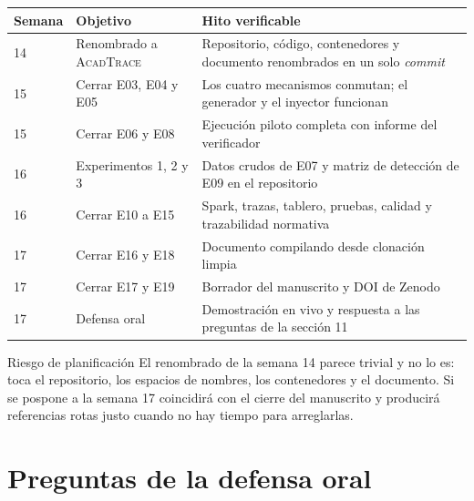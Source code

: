 \documentclass[11pt,a4paper]{article}
\begin{document}
\begin{center}
	\small
	\begin{tabular}{@{}p{1.8cm}p{6.4cm}p{6.6cm}@{}}
		\toprule
		\textbf{Semana} & \textbf{Objetivo} & \textbf{Hito verificable} \\
		\midrule
		14 & Renombrado a \textsc{AcadTrace} & Repositorio, código, contenedores y documento renombrados en un solo \emph{commit} \\
		15 & Cerrar E03, E04 y E05 & Los cuatro mecanismos conmutan; el generador y el inyector funcionan \\
		15 & Cerrar E06 y E08 & Ejecución piloto completa con informe del verificador \\
		16 & Experimentos 1, 2 y 3 & Datos crudos de E07 y matriz de detección de E09 en el repositorio \\
		16 & Cerrar E10 a E15 & Spark, trazas, tablero, pruebas, calidad y trazabilidad normativa \\
		17 & Cerrar E16 y E18 & Documento compilando desde clonación limpia \\
		17 & Cerrar E17 y E19 & Borrador del manuscrito y DOI de Zenodo \\
		17 & Defensa oral & Demostración en vivo y respuesta a las preguntas de la sección 11 \\
		\bottomrule
	\end{tabular}
\end{center}

\begin{alerta}{Riesgo de planificación}
	El renombrado de la semana 14 parece trivial y no lo es: toca el repositorio, los espacios de nombres, los contenedores y el documento. Si se pospone a la semana 17 coincidirá con el cierre del manuscrito y producirá referencias rotas justo cuando no hay tiempo para arreglarlas.
\end{alerta}

\section{Preguntas de la defensa oral}
\end{document}

